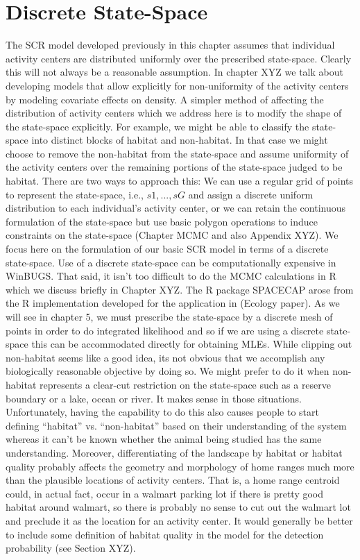 \section{Discrete State-Space}
The SCR model developed previously in this chapter assumes that individual activity centers are distributed uniformly over the prescribed state-space. Clearly this will not always be a reasonable assumption. In chapter XYZ we talk about developing models that allow explicitly for non-uniformity of the activity centers by modeling covariate effects on density. A simpler method of affecting the distribution of activity centers which we address here is to modify the shape of the state-space explicitly. For example, we might be able to classify the state-space into distinct blocks of habitat and non-habitat. In that case we might choose to remove the non-habitat from the state-space and assume uniformity of the activity centers over the remaining portions of the state-space judged to be habitat. 
There are two ways to approach this: We can use a regular grid of points to represent the state-space, i.e., $s1, ... , sG$ and assign a discrete uniform distribution to each individual's activity center, or we can retain the continuous formulation of the state-space but use basic polygon operations to induce constraints on the state-space (Chapter MCMC and also Appendix XYZ). We focus here on the formulation of our basic SCR model in terms of a discrete state-space. 
Use of a discrete state-space can be computationally expensive in
WinBUGS. That said, it isn't too difficult to do the MCMC calculations
in R which we discuss briefly in Chapter XYZ. The R package SPACECAP
\citep{gopalaswamy_etal:2011} arose from the R implementation
developed for the application in \citet{royle_etal:2009} (Ecology paper).  As we will see in chapter 5, we must prescribe the state-space by a discrete mesh of points in order to do integrated likelihood and so if we are using a discrete state-space this can be accommodated directly for obtaining MLEs. 
While clipping out non-habitat seems like a good idea, its not obvious that we accomplish any biologically reasonable objective by doing so. We might prefer to do it when non-habitat represents a clear-cut restriction on the state-space such as a reserve boundary or a lake, ocean or river. It makes sense in those situations.  Unfortunately, having the capability to do this also causes people to start defining ``habitat'' vs. ``non-habitat'' based on their understanding of the system whereas it can't be known whether the animal being studied has the same understanding. Moreover, differentiating of the landscape by habitat or habitat quality probably affects the geometry and morphology of home ranges much more than the plausible locations of activity centers. That is, a home range centroid could, in actual fact, occur in a walmart parking lot if there is pretty good habitat around walmart, so there is probably no sense to cut out the walmart lot and preclude it as the location for an activity center.  It would generally be better to include some definition of habitat quality in the model for the detection probability (see Section XYZ).



